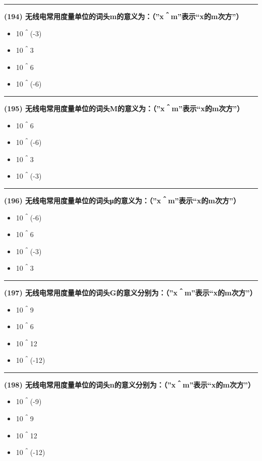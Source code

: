\documentclass[twocolumn]{ctexart}  %
\begin{document}
\noindent\rule{0.5\textwidth}{1pt}
\heiti \textbf{(194) 无线电常用度量单位的词头m的意义为：（”x＾m”表示“x的m次方”）} \songti {\color{gray} [LK0467] }
\begin{itemize}
	\item  10＾(-3)
	\item  10＾3
	\item  10＾6
	\item  10＾(-6)
\end{itemize}


\noindent\rule{0.5\textwidth}{1pt}
\heiti \textbf{(195) 无线电常用度量单位的词头M的意义为：（”x＾m”表示“x的m次方”）} \songti {\color{gray} [LK0468] }
\begin{itemize}
	\item  10＾6
	\item  10＾(-6)
	\item  10＾3
	\item  10＾(-3)
\end{itemize}


\noindent\rule{0.5\textwidth}{1pt}
\heiti \textbf{(196) 无线电常用度量单位的词头μ的意义为：（”x＾m”表示“x的m次方”）} \songti {\color{gray} [LK0469] }
\begin{itemize}
	\item  10＾(-6)
	\item  10＾6
	\item  10＾(-3)
	\item  10＾3
\end{itemize}


\noindent\rule{0.5\textwidth}{1pt}
\heiti \textbf{(197) 无线电常用度量单位的词头G的意义分别为：（”x＾m”表示“x的m次方”）} \songti {\color{gray} [LK0470] }
\begin{itemize}
	\item  10＾9
	\item  10＾6
	\item  10＾12
	\item  10＾(-12)
\end{itemize}


\noindent\rule{0.5\textwidth}{1pt}
\heiti \textbf{(198) 无线电常用度量单位的词头n的意义分别为：（”x＾m”表示“x的m次方”）} \songti {\color{gray} [LK0471] }
\begin{itemize}
	\item  10＾(-9)
	\item  10＾9
	\item  10＾12
	\item  10＾(-12)
\end{itemize}
\end{document}
